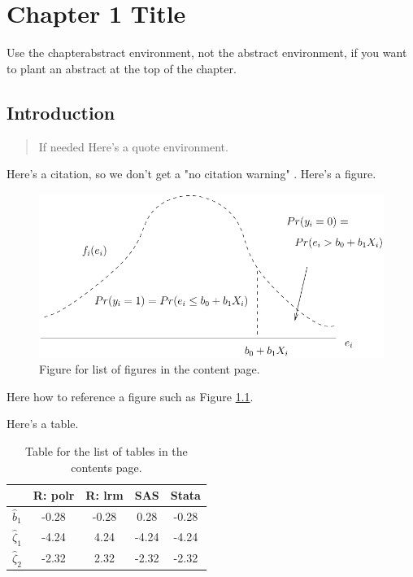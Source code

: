\chapter{Chapter 1 Title}

\begin{chapterabstract}
    Use the chapterabstract environment, not the abstract environment, if you want to plant an abstract at the top of the chapter.
\end{chapterabstract}

\section{Introduction}

\begin{quote}
If needed Here's a quote environment.
\end{quote}


Here's a citation, so we don't get a "no citation warning" \cite{GolV13}. Here's a figure.
\begin{figure}
    \begin{centering}
        \includegraphics[scale=0.8]{chap_1/chap_1_figures/example_1.pdf}
    \par\end{centering}
    \caption{Figure for list of figures  in the content page.}
    \label{fig:first_fig}
\end{figure}
Here how to reference a figure such as Figure \ref{fig:first_fig}.
\newpage



Here's a table.
\begin{table}
    \centering{}
    \begin{tabular}{|c|c|c|c|c|}
        \hline
            & R: polr & R: lrm & SAS & Stata\tabularnewline
        \hline
        \hline
        $\hat{b}_{1}$ & -0.28 & -0.28 & 0.28 & -0.28\tabularnewline
        \hline
        $\hat{\zeta}_{1}$ & -4.24 & 4.24 & -4.24 & -4.24\tabularnewline
        \hline
        $\hat{\zeta}_{2}$ & -2.32 & 2.32 & -2.32 & -2.32\tabularnewline
        \hline
    \end{tabular}
    \caption{Table for the list of tables in the contents page.}
    \label{tab:random_table}
\end{table}

